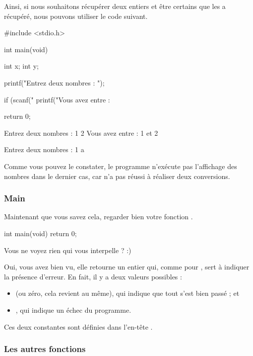 Ainsi, si nous souhaitons récupérer deux entiers et être certains que
 les a récupéré, nous pouvons utiliser le code suivant.

\begin{C}
#include <stdio.h>


int main(void)
{
    int x;
    int y;

    printf("Entrez deux nombres : ");

    if (scanf("%
        printf("Vous avez entre : %

    return 0;
}
\end{C}

\begin{C}
Entrez deux nombres : 1 2
Vous avez entre : 1 et 2

Entrez deux nombres : 1 a
\end{C}

Comme vous pouvez le constater, le programme n'exécute pas l'affichage
des nombres dans le dernier cas, car  n'a pas réussi à
réaliser deux conversions.

\subsubsection{Main}
\label{main}

Maintenant que vous savez cela, regarder bien votre fonction
.

\begin{C}
int main(void)
{
    return 0;
}
\end{C}

Vous ne voyez rien qui vous interpelle ? :)

Oui, vous avez bien vu, elle retourne un entier qui, comme pour
, sert à indiquer la présence d'erreur. En fait, il y a
deux valeurs possibles :

\begin{itemize}
\item
   (ou zéro, cela revient au même), qui indique
  que tout s'est bien passé ; et
\item
  , qui indique un échec du programme.
\end{itemize}

Ces deux constantes sont définies dans l'en-tête
.

\subsubsection{Les autres fonctions}
\label{les-autres-fonctions}

